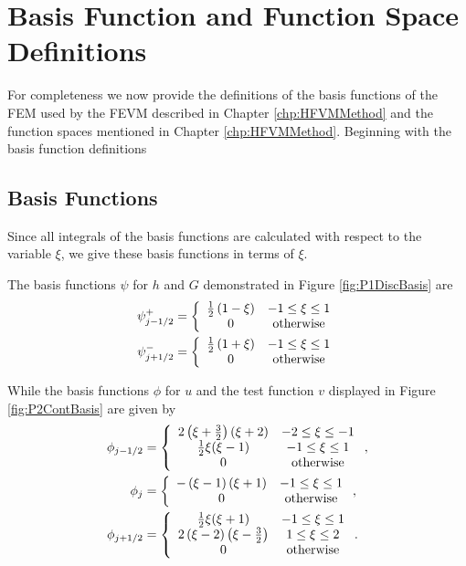\chapter{Basis Function and Function Space Definitions}
\label{app:FEMIntegrals}
For completeness we now provide the definitions of the basis functions of the FEM used by the FEVM described in Chapter \ref{chp:HFVMMethod} and the function spaces mentioned in Chapter \ref{chp:HFVMMethod}. Beginning with the basis function definitions 

\section{Basis Functions}
Since all integrals of the basis functions are calculated with respect to the variable $\xi$, we give these basis functions in terms of $\xi$.

The basis functions $\psi$ for $h$ and $G$ demonstrated in Figure \ref{fig:P1DiscBasis} are
\begin{subequations}
\begin{align}
\label{eqn:App1:PsiDef}
\psi^+_{j-1/2} &= \left\lbrace \begin{array}{c c}
\frac{1}{2}\left(1 - \xi\right) & -1 \le \xi \le 1\\
0 & \text{otherwise}
\end{array} \right. \\
\psi^-_{j+1/2} &= \left\lbrace \begin{array}{c c}
\frac{1}{2}\left(1 + \xi\right) & -1 \le \xi \le 1\\
0 & \text{otherwise}
\end{array} \right. 
\end{align}
\end{subequations}

While the basis functions $\phi$ for $u$ and the test function $v$ displayed in Figure \ref{fig:P2ContBasis} are given by
\begin{align}
\phi_{j-1/2} &= \left\lbrace \begin{array}{c c}
2 \left(\xi + \frac{3}{2}\right)\left(\xi + 2\right) & -2 \le \xi \le -1\\
\frac{1}{2}\xi(\xi - 1) & -1 \le \xi \le 1\\
0 & \text{otherwise}\end{array} \right.  ,\\
\phi_{j} &= \left\lbrace \begin{array}{c c}
-\left(\xi - 1\right)\left(\xi + 1\right) & -1 \le \xi \le 1\\
0 & \text{otherwise}
\end{array} \right. , \\ 
\phi_{j+1/2} &= \left\lbrace \begin{array}{c c}
\frac{1}{2}\xi(\xi + 1) & -1 \le \xi \le 1\\
2\left(\xi - 2\right)\left(\xi - \frac{3}{2} \right) & 1 \le \xi \le 2\\
0 & \text{otherwise}
\end{array} \right. .\\ 
\end{align}

